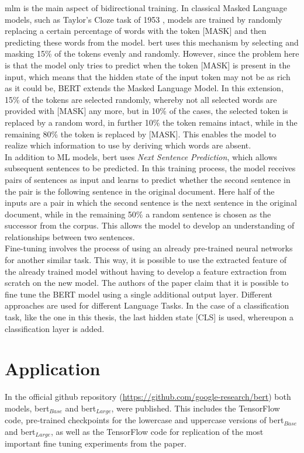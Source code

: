 \documentclass[a4paper, 11pt,titlepage,oneside,openany]{book}
\begin{document}
\noindent \gls{mlm} is the main aspect of bidirectional training. In classical Masked Language models, such as Taylor's Cloze task of 1953 \cite{cloze}, models are trained by randomly replacing a certain percentage of words with the token [MASK] and then predicting these words from the model. \gls{bert} uses this mechanism by selecting and masking 15\% of the tokens evenly and randomly. However, since the problem here is that the model only tries to predict when the token [MASK] is present in the input, which means that the hidden state of the input token may not be as rich as it could be, BERT extends the Masked Language Model. In this extension, 15\% of the tokens are selected randomly, whereby not all selected words are provided with [MASK] any more, but in 10\% of the cases, the selected token is replaced by a random word, in further 10\% the token remains intact, while in the remaining 80\% the token is replaced by [MASK]. This enables the model to realize which information to use by deriving which words are absent.\\
\noindent In addition to ML models, \gls{bert} uses \textit{Next Sentence Prediction}, which allows subsequent sentences to be predicted. In this training process, the model receives pairs of sentences as input and learns to predict whether the second sentence in the pair is the following sentence in the original document. Here half of the inputs are a pair in which the second sentence is the next sentence in the original document, while in the remaining 50\% a random sentence is chosen as the successor from the corpus. This allows the model to develop an understanding of relationships between two sentences. \\

\noindent Fine-tuning involves the process of using an already pre-trained neural networks for another similar task. This way, it is possible to use the extracted feature of the already trained model without having to develop a feature extraction from scratch on the new model. The authors of the paper claim that it is possible to fine tune the BERT model using a single additional output layer. Different approaches are used for different Language Tasks. In the case of a classification task, like the one in this thesis, the last hidden state [CLS] is used, whereupon a classification layer is added. 
\section{Application}
In the official github repository (\url{https://github.com/google-research/bert}) both models, \gls{bert}$_{Base}$ and \gls{bert}$_{Large}$, were published. This includes the TensorFlow \cite{tensorflow} code, pre-trained checkpoints for the lowercase and uppercase versions of \gls{bert}$_{Base}$ and \gls{bert}$_{Large}$, as well as the TensorFlow code for replication of the most important fine tuning experiments from the paper.
\end{document}

